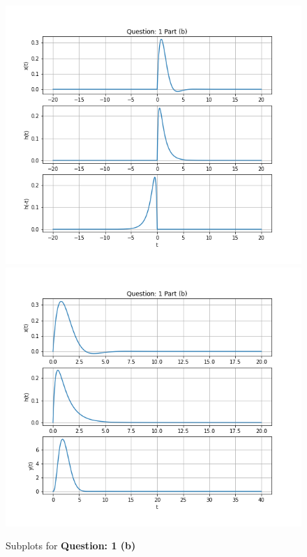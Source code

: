 \documentclass{article}
\begin{document}
    \begin{figure}[h]
        \centering
        \includegraphics[scale=0.39]{./Assets/1-b-i.png}
        \includegraphics[scale=0.39]{./Assets/1-b-ii.png}
        \caption*{Subplots for \textbf{Question: 1 (b)}}
    \end{figure}
\end{document}
